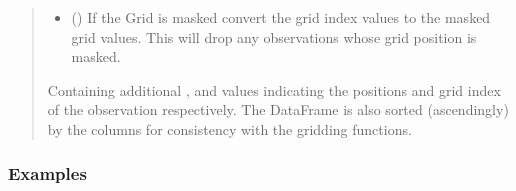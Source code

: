 \documentclass[letterpaper,10pt,english]{sphinxmanual}
\begin{document}
\begin{fulllineitems}
\begin{fulllineitems}
\begin{quote}
\begin{description}
\begin{itemize}
\item {}
\sphinxAtStartPar
{} () \textendash{} If the Grid is masked convert the grid index values to the masked
grid values. This will drop any observations whose grid position is
masked.

\end{itemize}

\sphinxAtStartPar
{} \textendash{} Containing additional , and  values
indicating the positions and grid index of the observation
respectively. The DataFrame is also sorted (ascendingly) by the
 columns for consistency with the gridding functions.

\sphinxAtStartPar
{}

\end{description}\end{quote}
\subsubsection*{Examples}

\begin{sphinxVerbatim}[commandchars=\\\{\}]
  
  
  
\end{sphinxVerbatim}

\end{fulllineitems}



\end{fulllineitems}
\end{document}
